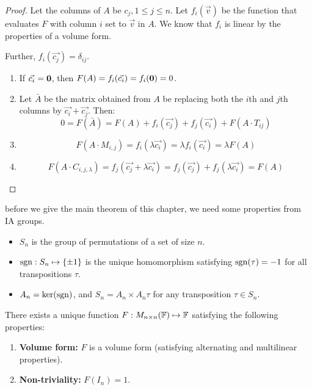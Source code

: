 \documentclass[../Main.tex]{subfiles}
\begin{document}
\begin{proof}
    Let the columns of $A$ be $c_j, 1 \leq j \leq n$. Let $f_i(\vec{v})$ be the function that evaluates $F$ with column $i$ set to $\vec{v}$ in $A$. We know that $f_i$ is linear by the properties of a volume form.

    Further, $f_i(\vec{c_j}) = \delta_{ij}$.
    \begin{enumerate}
        \item If $\vec{c_i} = \boldsymbol{0}$, then $F(A) = f_i(\vec{c_i}) = f_i(\boldsymbol{0}) = 0$.
        \item Let $\bar{A}$ be the matrix obtained from $A$ be replacing both the $i$th and $j$th columns by $\vec{c_i} + \vec{c_j}$. Then:
            \begin{equation*}
                0 = F(\bar{A}) = F(A) + f_i(\vec{c_j}) + f_j(\vec{c_i}) + F(A \cdot T_{ij})
            \end{equation*}
        \item \begin{equation*}
            F(A \cdot M_{i, j}) = f_i(\lambda \vec{c_i}) = \lambda f_i(\vec{c_i}) = \lambda F(A)
        \end{equation*}
        \item \begin{equation*}
            F(A \cdot C_{i, j, \lambda}) = f_j(\vec{c_j} + \lambda \vec{c_i}) = f_j(\vec{c_j}) + f_j(\lambda \vec{c_i}) = F(A)
        \end{equation*}
    \end{enumerate}
\end{proof}
before we give the main theorem of this chapter, we need some properties from IA groups.
\begin{itemize}
    \item $S_n$ is the group of permutations of a set of size $n$.
    \item $\operatorname{sgn} : S_n \mapsto \{\pm1\}$ is the unique homomorphism satisfying $\operatorname{sgn}(\tau) = -1$ for all transpositions $\tau$.
    \item $A_n = \ker(\operatorname{sgn})$, and $S_n = A_n \times A_n\tau$ for any transposition $\tau \in S_n$.
\end{itemize}
\begin{theorem}
    There exists a unique function $F : M_{n \times n}(\mathbb{F}) \mapsto \mathbb{F}$ satisfying the following properties:
    \begin{enumerate}
        \item \textbf{Volume form:} $F$ is a volume form (satisfying alternating and multilinear properties).
        \item \textbf{Non-triviality:} $F(I_n) = 1$.
    \end{enumerate}
    \label{thmDeterminant}
\end{theorem}
\end{document}
